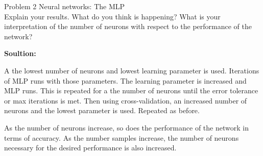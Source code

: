 \documentclass[a4paper]{article}
\begin{document}
\begin {description}
\begin{doublespace}
\begin{enumerate}[(e) i.]
\begin{center}
\end{center}
\end{enumerate}
\end{doublespace}

\item[Problem 2] Neural networks: The MLP \\Explain your results. What do you think is happening? What is your interpretation of the number of neurons with respect to the performance of the network?

\smallskip
\textbf{Soultion:}
\begin{doublespace}
A the lowest number of neurons and lowest learning parameter is used. Iterations of MLP runs with those parameters. The learning parameter is increased and MLP runs. This is repeated for a the number of neurons until the error tolerance or max iterations is met. Then using cross-validation, an increased number of neurons and the lowest parameter is used. Repeated as before. 

As the number of neurons increase, so does the performance of the network in terms of accuracy. As the number samples increase, the number of neurons necessary for the desired performance is also increased.
\end{doublespace}
\end {description}
\end{document}
